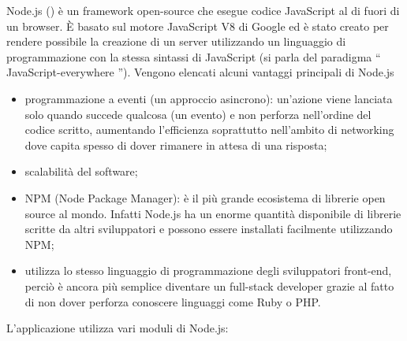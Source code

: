 \documentclass[12pt]{report}
\begin{document}
Node.js (\cite{nodejs}) è un framework open-source che esegue codice JavaScript al di fuori di un browser. È basato sul motore JavaScript V8 di Google ed è stato creato per rendere possibile la creazione di un server utilizzando un linguaggio di programmazione con la stessa sintassi di JavaScript (si parla del paradigma \textquotedblleft{} JavaScript-everywhere \textquotedblright{}). Vengono elencati alcuni vantaggi principali di Node.js

\begin{itemize}
	\item programmazione a eventi (un approccio asincrono): un'azione viene lanciata solo quando succede qualcosa (un evento) e non perforza nell'ordine del codice scritto, aumentando l'efficienza soprattutto nell'ambito di networking dove capita spesso di dover rimanere in attesa di una risposta;
	\item scalabilità del software;
	\item NPM (Node Package Manager): è il più grande ecosistema di librerie open source al mondo. Infatti Node.js ha un enorme quantità disponibile di librerie scritte da altri sviluppatori e possono essere installati facilmente utilizzando NPM;
	\item utilizza lo stesso linguaggio di programmazione degli sviluppatori front-end, perciò è ancora più semplice diventare un full-stack developer grazie al fatto di non dover perforza conoscere linguaggi come Ruby o PHP.
\end{itemize}
L'applicazione utilizza vari moduli di Node.js:
\end{document}
